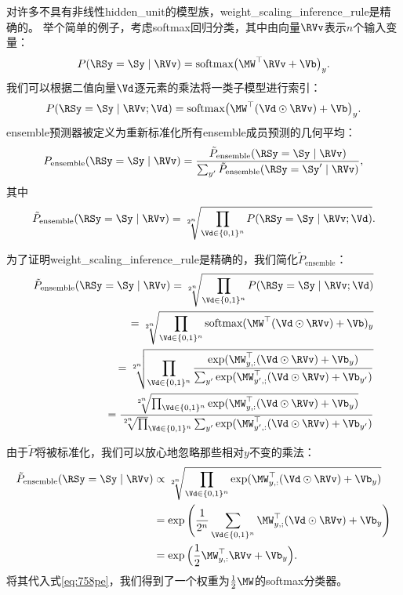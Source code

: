 对许多不具有非线性\gls{hidden_unit}的模型族，\gls{weight_scaling_inference_rule}是精确的。
举个简单的例子，考虑\gls{softmax}回归分类，其中由向量$\RVv$表示$n$个输入变量：
\begin{align}
 P(\RSy = \Sy \mid \RVv) = \text{softmax}\big(\MW^\top\RVv + \Vb\big)_y.
\end{align}
我们可以根据二值向量$\Vd$逐元素的乘法将一类子模型进行索引：
\begin{align}
P(\RSy = \Sy \mid \RVv; \Vd) = \text{softmax}\big(\MW^\top(\Vd \odot \RVv) + \Vb \big)_y.
\end{align}
\gls{ensemble}预测器被定义为重新标准化所有\gls{ensemble}成员预测的几何平均：
\begin{align} \label{eq:758pe}
P_{\text{ensemble}}(\RSy = \Sy \mid \RVv)  = \frac{\tilde{P}_{\text{ensemble}}(\RSy = \Sy \mid \RVv)}
 {\sum_{y'}\tilde{P}_{\text{ensemble}}(\RSy = \Sy' \mid \RVv) },
\end{align}
其中
\begin{align}
\tilde{P}_{\text{ensemble}}(\RSy=\Sy \mid \RVv) =
\sqrt[2^n]{\prod_{\Vd \in \{0,1\}^n} P(\RSy = \Sy \mid \RVv; \Vd)}.
\end{align}

为了证明\gls{weight_scaling_inference_rule}是精确的，我们简化$ \tilde{P}_{\text{ensemble}}$：
\begin{align}
\tilde{P}_{\text{ensemble}}(\RSy=\Sy \mid \RVv) =
\sqrt[2^n]{\prod_{\Vd \in \{0,1\}^n} P(\RSy = \Sy \mid \RVv; \Vd)} \\
= \sqrt[2^n]{\prod_{\Vd \in \{0,1\}^n} \text{softmax}(\MW^\top(\Vd \odot \RVv) + \Vb)_y} \\
= \sqrt[2^n]{\prod_{\Vd \in \{0,1\}^n} \frac{\exp (\MW_{y,:}^\top(\Vd \odot \RVv) + \Vb_y)}
{\sum_{y'}\exp (\MW_{y',;}^\top(\Vd \odot \RVv) + \Vb_{y'})}}\\
=  \frac{\sqrt[2^n]{\prod_{\Vd \in \{0,1\}^n}\exp (\MW_{y,:}^\top(\Vd \odot \RVv) + \Vb_y)}}
{ \sqrt[2^n] \prod_{\Vd \in \{0,1\}^n} \sum_{y'}\exp (\MW_{y',:}^\top(\Vd \odot \RVv) + \Vb_{y'})}
\end{align}

由于$\tilde P$将被标准化，我们可以放心地忽略那些相对$y$不变的乘法：
\begin{align}
\tilde{P}_{\text{ensemble}}(\RSy=\Sy \mid \RVv) &\propto 
\sqrt[2^n]{\prod_{\Vd \in \{0,1\}^n} \exp (\MW_{y,:}^\top(\Vd \odot \RVv) + \Vb_y)} \\
& = \exp \Bigg(\frac{1}{2^n} \sum_{\Vd \in \{0,1\}^n} \MW_{y,;}^\top(\Vd \odot \RVv) + \Vb_y \Bigg) \\
& = \exp \Big(\frac{1}{2}\MW_{y,:}^\top \RVv + \Vb_y \Big) .
\end{align}
将其代入式\ref{eq:758pe}，我们得到了一个权重为$\frac{1}{2}\MW$的\gls{softmax}分类器。

